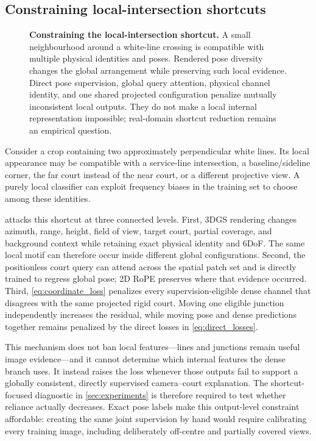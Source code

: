 \subsection{Constraining local-intersection shortcuts}
\label{sec:shortcut}

\begin{figure}[t]
  \centering
  \resizebox{\linewidth}{!}{}
  \caption{\textbf{Constraining the local-intersection shortcut.}  A small
  neighbourhood around a white-line crossing is compatible with multiple
  physical identities and poses.  Rendered pose diversity changes the global
  arrangement while preserving such local evidence.  Direct pose supervision,
  global query attention, physical channel identity, and one shared projected
  \KP configuration penalize mutually inconsistent local outputs.  They do not
  make a local internal representation impossible; real-domain shortcut
  reduction remains an empirical question.}
  \label{fig:shortcut}
\end{figure}

Consider a crop containing two approximately perpendicular white lines.  Its
local appearance may be compatible with a service-line intersection, a
baseline/sideline corner, the far court instead of the near court, or a
different projective view.  A purely local classifier can exploit frequency
biases in the training set to choose among these identities.

\Method{} attacks this shortcut at three connected levels.
First, 3DGS rendering changes azimuth, range, height, field of view, target
court, partial coverage, and background context while retaining exact physical
identity and 6DoF.  The same local motif can therefore occur inside different
global configurations.  Second, the positionless court query can attend across
the spatial patch set and is directly trained to regress global pose; 2D RoPE
preserves where that evidence occurred.  Third,
\cref{eq:coordinate_loss} penalizes every supervision-eligible dense channel
that disagrees with the same projected rigid court.  Moving one eligible
junction independently increases the residual, while moving pose and dense
predictions together remains penalized by the direct losses in
\cref{eq:direct_losses}.

This mechanism does not ban local features---lines and junctions remain useful
image evidence---and it cannot determine which internal features the dense
branch uses.  It instead raises the loss whenever those outputs fail to support
a globally consistent, directly supervised camera--court explanation.  The
shortcut-focused diagnostic in \cref{sec:experiments} is therefore required to
test whether reliance actually decreases.  Exact pose labels make this
output-level constraint affordable: creating the same joint supervision by
hand would require calibrating every training image, including deliberately
off-centre and partially covered views.
